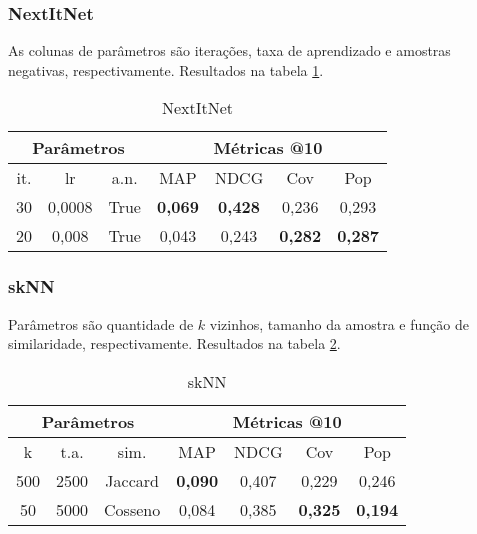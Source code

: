 \subsubsection{NextItNet}

As colunas de parâmetros são iterações, taxa de aprendizado e amostras
negativas, respectivamente. Resultados na tabela \ref{opt:NextItNet_rem}.
\begin{table}[htbp]
  \centering
  \begin{tabular}{|c|c|c|c|c|c|c|}
    \hline
      \multicolumn{3}{|c|}{Parâmetros} & \multicolumn{4}{c|}{Métricas @10} \\
      \hline
      it. & lr & a.n. & MAP & NDCG & Cov & Pop \\
      \hline
      30 & 0,0008 & True & \textbf{0,069} & \textbf{0,428} & 0,236 & 0,293 \\
      \hline
      20 & 0,008 & True & 0,043 & 0,243 & \textbf{0,282} & \textbf{0,287} \\
      \hline
\end{tabular}
      \caption{NextItNet}
      \label{opt:NextItNet_rem}
\end{table}

\subsubsection{skNN}
Parâmetros são quantidade de $k$ vizinhos, tamanho da amostra e função de
similaridade, respectivamente. Resultados na tabela \ref{opt:skNN_rem}.
\begin{table}[htbp]
  \centering
  \begin{tabular}{|c|c|c|c|c|c|c|}
    \hline
      \multicolumn{3}{|c|}{Parâmetros} & \multicolumn{4}{c|}{Métricas @10} \\
      \hline
      k & t.a. & sim. & MAP & NDCG & Cov & Pop \\
      \hline
      500 & 2500 & Jaccard & \textbf{0,090} & 0,407 & 0,229 & 0,246 \\
      \hline
      50 & 5000 & Cosseno & 0,084 & 0,385 & \textbf{0,325} & \textbf{0,194} \\
      \hline
      \end{tabular}
      \caption{skNN}
      \label{opt:skNN_rem}
\end{table}

